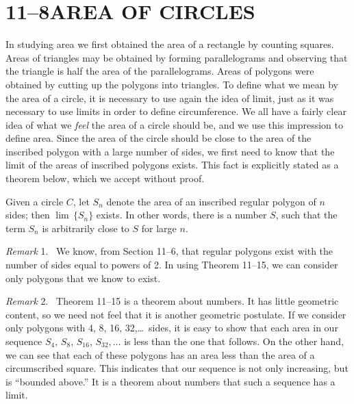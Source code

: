 \documentclass[11pt]{book}
\theoremstyle{XIplainnote}
\theoremstyle{bkplain}
\newenvironment{XIremarkn}[1]{\par\medskip\noindent\emph{Remark} #1.\ }%
  {\par\medskip}
\begin{document}
\section*{11--8\quad AREA OF CIRCLES}

In studying area we first obtained the area of a rectangle by counting squares.
Areas of triangles may be obtained by forming parallelograms and observing that
the triangle is half the area of the parallelograms. Areas of polygons were
obtained by cutting up the polygons into triangles. To define what we mean by
the area of a circle, it is necessary to use again the idea of limit, just as it
was necessary to use limits in order to define circumference. We all have a
fairly clear idea of what we \emph{feel} the area of a circle should be, and we
use this impression to define area. Since the area of the circle should be
close to the area of the inscribed polygon with a large number of sides, we
first need to know that the limit of the areas of inscribed polygons exists.
This fact is explicitly stated as a theorem below, which we accept without
proof.

\begin{theorem}
Given a circle $C$, let $S_n$ denote the area of an inscribed regular polygon
of $n$ sides; then $\lim\,\{S_n\}$ exists. In other words, there is a number
$S$, such that the term $S_n$ is arbitrarily close to $S$ for large $n$.
\end{theorem}

\begin{XIremarkn}{1}
We know, from Section 11--6, that regular polygons exist with the number of
sides equal to powers of 2. In using Theorem 11--15, we can consider only
polygons that we know to exist.
\end{XIremarkn}

\begin{XIremarkn}{2}
Theorem 11--15 is a theorem about numbers. It has little geometric content,
so we need not feel that it is another geometric postulate. If we consider only
polygons with 4, 8, 16, 32,\ldots\ sides, it is easy to show that each area in
our sequence $S_4$, $S_8$, $S_{16}$, $S_{32},\ldots$ is less than the one that
follows. On the other hand, we can see that each of these polygons has an area
less than the area of a circumscribed square. This indicates that our sequence
is not only increasing, but is ``bounded above.'' It is a theorem about numbers
that such a sequence has a limit.
\end{XIremarkn}
\end{document}
